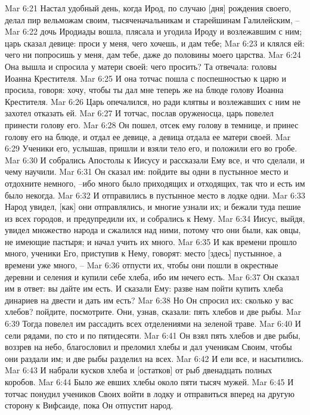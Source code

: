 Mar 6:21  Настал удобный день, когда Ирод, по случаю [дня] рождения своего, делал пир вельможам своим, тысяченачальникам и старейшинам Галилейским, --
Mar 6:22  дочь Иродиады вошла, плясала и угодила Ироду и возлежавшим с ним; царь сказал девице: проси у меня, чего хочешь, и дам тебе;
Mar 6:23  и клялся ей: чего ни попросишь у меня, дам тебе, даже до половины моего царства.
Mar 6:24  Она вышла и спросила у матери своей: чего просить? Та отвечала: головы Иоанна Крестителя.
Mar 6:25  И она тотчас пошла с поспешностью к царю и просила, говоря: хочу, чтобы ты дал мне теперь же на блюде голову Иоанна Крестителя.
Mar 6:26  Царь опечалился, но ради клятвы и возлежавших с ним не захотел отказать ей.
Mar 6:27  И тотчас, послав оруженосца, царь повелел принести голову его.
Mar 6:28  Он пошел, отсек ему голову в темнице, и принес голову его на блюде, и отдал ее девице, а девица отдала ее матери своей.
Mar 6:29  Ученики его, услышав, пришли и взяли тело его, и положили его во гробе.
Mar 6:30  И собрались Апостолы к Иисусу и рассказали Ему все, и что сделали, и чему научили.
Mar 6:31  Он сказал им: пойдите вы одни в пустынное место и отдохните немного, --ибо много было приходящих и отходящих, так что и есть им было некогда.
Mar 6:32  И отправились в пустынное место в лодке одни.
Mar 6:33  Народ увидел, [как] они отправлялись, и многие узнали их; и бежали туда пешие из всех городов, и предупредили их, и собрались к Нему.
Mar 6:34  Иисус, выйдя, увидел множество народа и сжалился над ними, потому что они были, как овцы, не имеющие пастыря; и начал учить их много.
Mar 6:35  И как времени прошло много, ученики Его, приступив к Нему, говорят: место [здесь] пустынное, а времени уже много, --
Mar 6:36  отпусти их, чтобы они пошли в окрестные деревни и селения и купили себе хлеба, ибо им нечего есть.
Mar 6:37  Он сказал им в ответ: вы дайте им есть. И сказали Ему: разве нам пойти купить хлеба динариев на двести и дать им есть?
Mar 6:38  Но Он спросил их: сколько у вас хлебов? пойдите, посмотрите. Они, узнав, сказали: пять хлебов и две рыбы.
Mar 6:39  Тогда повелел им рассадить всех отделениями на зеленой траве.
Mar 6:40  И сели рядами, по сто и по пятидесяти.
Mar 6:41  Он взял пять хлебов и две рыбы, воззрев на небо, благословил и преломил хлебы и дал ученикам Своим, чтобы они раздали им; и две рыбы разделил на всех.
Mar 6:42  И ели все, и насытились.
Mar 6:43  И набрали кусков хлеба и [остатков] от рыб двенадцать полных коробов.
Mar 6:44  Было же евших хлебы около пяти тысяч мужей.
Mar 6:45  И тотчас понудил учеников Своих войти в лодку и отправиться вперед на другую сторону к Вифсаиде, пока Он отпустит народ.
